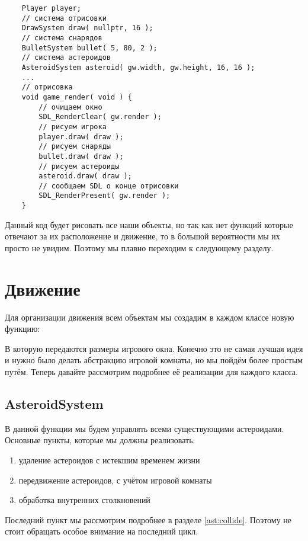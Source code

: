 \begin{lstlisting}
    Player player;
    // система отрисовки
    DrawSystem draw( nullptr, 16 );
    // система снарядов
    BulletSystem bullet( 5, 80, 2 );
    // система астероидов
    AsteroidSystem asteroid( gw.width, gw.height, 16, 16 );
    ...
    // отрисовка
    void game_render( void ) {
        // очищаем окно
        SDL_RenderClear( gw.render );
        // рисуем игрока
        player.draw( draw );
        // рисуем снаряды
        bullet.draw( draw );
        // рисуем астероиды
        asteroid.draw( draw );
        // сообщаем SDL о конце отрисовки
        SDL_RenderPresent( gw.render );
    }
\end{lstlisting}

Данный код будет рисовать все наши объекты, но так как нет функций которые отвечают за их расположение и 
движение, то в большой вероятности мы их просто не увидим. Поэтому мы плавно переходим к следующему разделу.

\pagebreak

\section{Движение}
Для организации движения всем объектам мы создадим в каждом классе новую функцию:


В которую передаются размеры игрового окна. Конечно это не самая лучшая идея и нужно было делать абстракцию 
игровой комнаты, но мы пойдём более простым путём. Теперь давайте рассмотрим подробнее её реализации для 
каждого класса.

\subsection{AsteroidSystem}
В данной функции мы будем управлять всеми существующими астероидами. Основные пункты, которые мы должны 
реализовать:
\begin{enumerate}
    \item удаление астероидов с истекшим временем жизни
    \item передвижение астероидов, с учётом игровой комнаты
    \item обработка внутренних столкновений
\end{enumerate}

Последний пункт мы рассмотрим подробнее в разделе \ref{ast:collide}. Поэтому не стоит обращать особое 
внимание на последний цикл.


